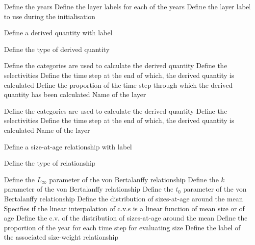 \par\textbf{}\par
{} {Define the years}
 {Define the layer labels for each of the years}
 {Define the layer label to use during the initialisation}
\par{} {Define a derived quantity with label}\par
{} {Define the type of derived quantity}
\par\textbf{}\par
{} {Define the categories are used to calculate the derived quantity}
 {Define the selectivities}
 {Define the time step at the end of which, the derived quantity is calculated}
 {Define the proportion of the time step through which the derived quantity has been calculated}
 {Name of the layer}
\par\textbf{}\par
{} {Define the categories are used to calculate the derived quantity}
 {Define the selectivities}
 {Define the time step at the end of which, the derived quantity is calculated}
 {Name of the layer}
\par{} {Define a size-at-age relationship with label}\par
{} {Define the type of relationship}
\par\textbf{}\par
{} {Define the $L_\infty$ parameter of the von Bertalanffy relationship}
 {Define the $k$ parameter of the von Bertalanffy relationship}
 {Define the $t_0$ parameter of the von Bertalanffy relationship}
 {Define the distribution of sizes-at-age around the mean}
 {Specifies if the linear interpolation of c.v.s is a linear function of mean size or of age}
 {Define the c.v. of the distribution of sizes-at-age around the mean}
 {Define the proportion of the year for each time step for evaluating size}
 {Define the label of the associated size-weight relationship}
\par\textbf{}\par
